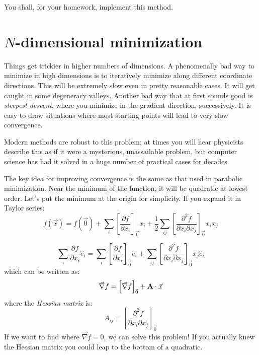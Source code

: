 You shall, for your homework, implement this method.

\section{$N$-dimensional minimization}

Things get trickier in higher numbers of dimensions. A phenomenally
bad way to minimize in high dimensions is to iteratively minimize
along different coordinate directions.  This will be extremely slow
even in pretty reasonable cases.  It will get caught in some
degeneracy valleys.  Another bad way that at first sounds good is {\it
  steepest descent}, where you minimize in the gradient direction,
successively. It is easy to draw situations where most starting
points will lead to very slow convergence.

Modern methods are robust to this problem; at times you will hear
physicists describe this as if it were a mysterious, unassailable
problem, but computer science has had it solved in a huge number of
practical cases for decades.

The key idea for improving convergence is the same as that used in
parabolic minimization. Near the minimum of the function, it will be
quadratic at lowest order. Let's put the minimum at the origin for
simplicity. If you expand it in Taylor series:
\begin{equation}
  f(\vec{x}) = f(\vec{0})
  + \sum_i \left[\frac{\partial f}{\partial x_i}\right]_{\vec{0}}  x_i
  + \frac{1}{2} \sum_{ij} \left[\frac{\partial^2 f}{\partial x_i \partial x_j}\right]_{\vec{0}}
  x_i x_j
\end{equation}


\begin{answer}
\begin{equation}
\sum_i \frac{\partial f}{\partial x_i} {\hat e}_i = \sum_i
\left[\frac{\partial f}{\partial x_i}\right]_{\vec{0}} {\hat e}_i +
\sum_{ij} \left[\frac{\partial^2 f}{\partial x_i \partial
    x_j}\right]_{\vec{0}} x_j {\hat e}_i
\end{equation}
which can be written as:
\begin{equation}
\vec{\nabla}f = \left[\vec{\nabla}f \right]_{\vec{0}} +
{\bf A}\cdot{\vec{x}}
\end{equation}
where the {\it Hessian matrix} is:
\begin{equation}
A_{ij} = 
\left[\frac{\partial^2 f}{\partial x_i \partial x_j}\right]_{\vec{0}}
\end{equation}
If we want to find where $\vec{\nabla}f=0$, we can solve this problem!
If you actually knew the Hessian matrix you could leap to the bottom
of a quadratic.
\end{answer}


